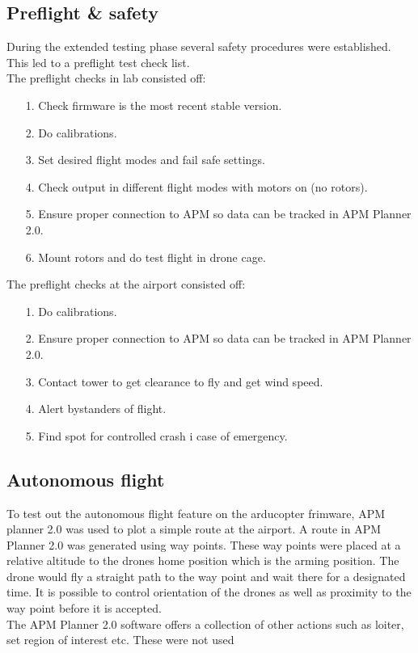 \subsection{Preflight \& safety}
During the extended testing phase several safety procedures were established. This led to a
preflight test check list.\\
The preflight checks in lab consisted off:
\begin{itemize}
\item[1.] Check firmware is the most recent stable version.
\item[2.] Do calibrations.
\item[3.] Set desired flight modes and fail safe settings.
\item[4.] Check output in different flight modes with motors on (no rotors).
\item[5.] Ensure proper connection to APM so data can be tracked in APM Planner 2.0.
\item[6.] Mount rotors and do test flight in drone cage.
\end{itemize}

The preflight checks at the airport consisted off:
\begin{itemize}
\item[1.] Do calibrations.
\item[2.] Ensure proper connection to APM so data can be tracked in APM Planner 2.0.
\item[3.] Contact tower to get clearance to fly and get wind speed.
\item[4.] Alert bystanders of flight.
\item[5.] Find spot for controlled crash i case of emergency.
\end{itemize}

\subsection{Autonomous flight}
To test out the autonomous flight feature on the arducopter frimware, APM planner 2.0 was used to
plot a simple route at the airport. A route in APM Planner 2.0 was generated using way points. These
way points were placed at a relative altitude to the drones home position which is the arming
position. The drone would fly a straight path to the way point and wait there for a designated time.
It is possible to control orientation of the drones as well as proximity to the way point before it
is accepted.\\
The APM Planner 2.0 software offers a collection of other actions such as loiter, set region of
interest etc. These were not used\\

